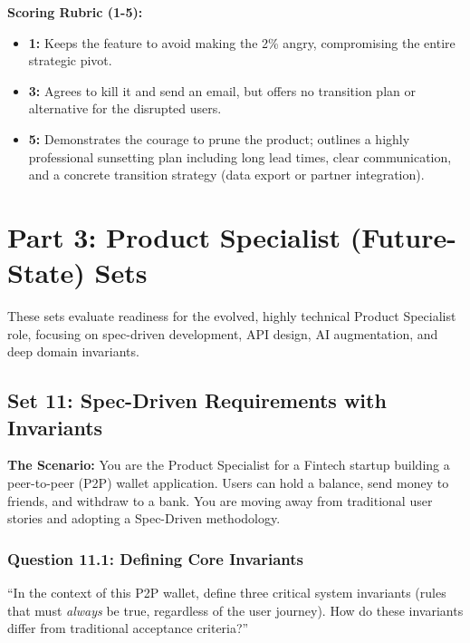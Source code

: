 \documentclass[
  11pt,
  openany,
  oneside]{book}
\providecommand{\tightlist}{%
  \setlength{\itemsep}{0pt}\setlength{\parskip}{0pt}}
\begin{document}
\textbf{Scoring Rubric (1-5):}

\begin{itemize}
\tightlist
\item
  \textbf{1:} Keeps the feature to avoid making the 2\% angry,
  compromising the entire strategic pivot.
\item
  \textbf{3:} Agrees to kill it and send an email, but offers no
  transition plan or alternative for the disrupted users.
\item
  \textbf{5:} Demonstrates the courage to prune the product; outlines a
  highly professional sunsetting plan including long lead times, clear
  communication, and a concrete transition strategy (data export or
  partner integration).
\end{itemize}

\bigskip

\section{Part 3: Product Specialist (Future-State)
Sets}\label{part-3-product-specialist-future-state-sets}

These sets evaluate readiness for the evolved, highly technical Product
Specialist role, focusing on spec-driven development, API design, AI
augmentation, and deep domain invariants.

\subsection{Set 11: Spec-Driven Requirements with
Invariants}\label{set-11-spec-driven-requirements-with-invariants}

\textbf{The Scenario:} You are the Product Specialist for a Fintech
startup building a peer-to-peer (P2P) wallet application. Users can hold
a balance, send money to friends, and withdraw to a bank. You are moving
away from traditional user stories and adopting a Spec-Driven
methodology.

\subsubsection{Question 11.1: Defining Core
Invariants}\label{question-11.1-defining-core-invariants}

``In the context of this P2P wallet, define three critical system
invariants (rules that must \emph{always} be true, regardless of the
user journey). How do these invariants differ from traditional
acceptance criteria?''
\end{document}
